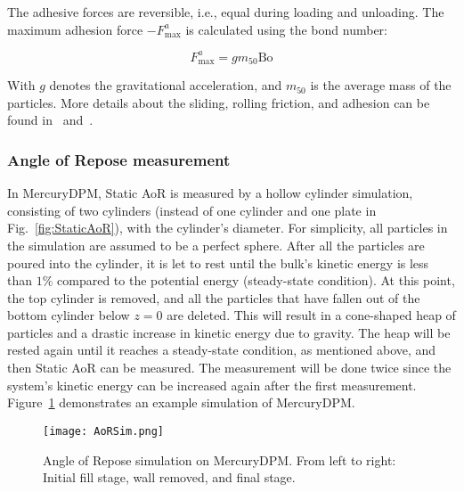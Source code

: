 The adhesive forces are reversible, i.e., equal during loading and unloading. The maximum adhesion force $-F^a_{\text{max}}$ is calculated using the bond number:

\begin{equation}\label{eq:bond}
    F^a_{\text{max}} = gm_{\text{50}}\text{Bo} 
\end{equation}

With $g$ denotes the gravitational acceleration, and $m_{50}$ is the average mass of the particles. More details about the sliding, rolling friction, and adhesion can be found in~\cite{MercuryDPM} and~\cite{LSD-info}. 
\subsubsection{Angle of Repose measurement}

In MercuryDPM, Static AoR is measured by a hollow cylinder simulation, consisting of two cylinders (instead of one cylinder and one plate in Fig.~\ref{fig:StaticAoR}), with the cylinder's diameter. For simplicity, all particles in the simulation are assumed to be a perfect sphere. After all the particles are poured into the cylinder, it is let to rest until the bulk's kinetic energy is less than $1\%$ compared to the potential energy (steady-state condition). At this point, the top cylinder is removed, and all the particles that have fallen out of the bottom cylinder below $z = 0$ are deleted. This will result in a cone-shaped heap of particles and a drastic increase in kinetic energy due to gravity. The heap will be rested again until it reaches a steady-state condition, as mentioned above, and then Static AoR can be measured. The measurement will be done twice since the system's kinetic energy can be increased again after the first measurement. Figure~\ref{fig:MercuryAoR} demonstrates an example simulation of MercuryDPM. 


\begin{figure}[H]
    \centering
    \texttt{[image: AoRSim.png]}
    \caption{Angle of Repose simulation on MercuryDPM. From left to right: Initial fill stage, wall removed, and final stage.}\label{fig:MercuryAoR}
\end{figure}
